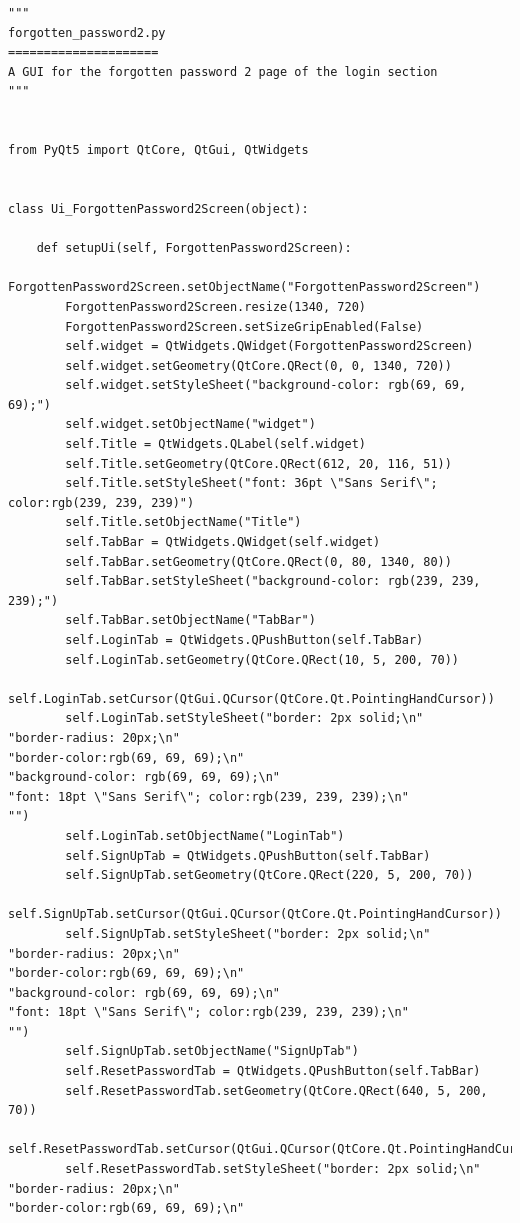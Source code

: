 \documentclass{article}
\begin{document}
\begin{lstlisting}
"""
forgotten_password2.py
=====================
A GUI for the forgotten password 2 page of the login section
"""


from PyQt5 import QtCore, QtGui, QtWidgets


class Ui_ForgottenPassword2Screen(object):

    def setupUi(self, ForgottenPassword2Screen):
        ForgottenPassword2Screen.setObjectName("ForgottenPassword2Screen")
        ForgottenPassword2Screen.resize(1340, 720)
        ForgottenPassword2Screen.setSizeGripEnabled(False)
        self.widget = QtWidgets.QWidget(ForgottenPassword2Screen)
        self.widget.setGeometry(QtCore.QRect(0, 0, 1340, 720))
        self.widget.setStyleSheet("background-color: rgb(69, 69, 69);")
        self.widget.setObjectName("widget")
        self.Title = QtWidgets.QLabel(self.widget)
        self.Title.setGeometry(QtCore.QRect(612, 20, 116, 51))
        self.Title.setStyleSheet("font: 36pt \"Sans Serif\"; color:rgb(239, 239, 239)")
        self.Title.setObjectName("Title")
        self.TabBar = QtWidgets.QWidget(self.widget)
        self.TabBar.setGeometry(QtCore.QRect(0, 80, 1340, 80))
        self.TabBar.setStyleSheet("background-color: rgb(239, 239, 239);")
        self.TabBar.setObjectName("TabBar")
        self.LoginTab = QtWidgets.QPushButton(self.TabBar)
        self.LoginTab.setGeometry(QtCore.QRect(10, 5, 200, 70))
        self.LoginTab.setCursor(QtGui.QCursor(QtCore.Qt.PointingHandCursor))
        self.LoginTab.setStyleSheet("border: 2px solid;\n"
"border-radius: 20px;\n"
"border-color:rgb(69, 69, 69);\n"
"background-color: rgb(69, 69, 69);\n"
"font: 18pt \"Sans Serif\"; color:rgb(239, 239, 239);\n"
"")
        self.LoginTab.setObjectName("LoginTab")
        self.SignUpTab = QtWidgets.QPushButton(self.TabBar)
        self.SignUpTab.setGeometry(QtCore.QRect(220, 5, 200, 70))
        self.SignUpTab.setCursor(QtGui.QCursor(QtCore.Qt.PointingHandCursor))
        self.SignUpTab.setStyleSheet("border: 2px solid;\n"
"border-radius: 20px;\n"
"border-color:rgb(69, 69, 69);\n"
"background-color: rgb(69, 69, 69);\n"
"font: 18pt \"Sans Serif\"; color:rgb(239, 239, 239);\n"
"")
        self.SignUpTab.setObjectName("SignUpTab")
        self.ResetPasswordTab = QtWidgets.QPushButton(self.TabBar)
        self.ResetPasswordTab.setGeometry(QtCore.QRect(640, 5, 200, 70))
        self.ResetPasswordTab.setCursor(QtGui.QCursor(QtCore.Qt.PointingHandCursor))
        self.ResetPasswordTab.setStyleSheet("border: 2px solid;\n"
"border-radius: 20px;\n"
"border-color:rgb(69, 69, 69);\n"

\end{lstlisting}
\end{document}
